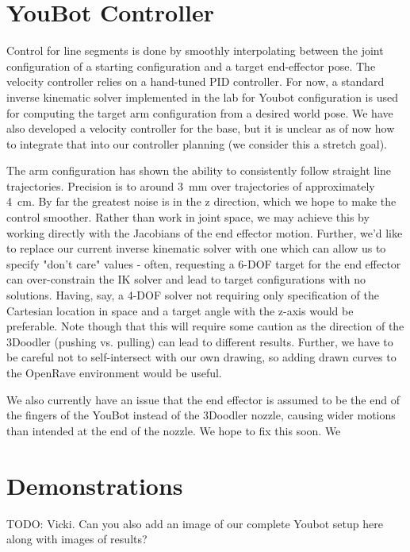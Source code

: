 \documentclass[conference]{acmsiggraph}
\begin{document}
\section{YouBot Controller}
Control for line segments is done by smoothly interpolating between the joint configuration of a starting configuration and a target end-effector pose.  The velocity controller relies on a hand-tuned PID controller.  For now, a standard inverse kinematic solver implemented in the lab for Youbot configuration is used for computing the target arm configuration from a desired world pose.  We have also developed a velocity controller for the base, but it is unclear as of now how to integrate that into our controller planning (we consider this a stretch goal).

The arm configuration has shown the ability to consistently follow straight line trajectories.  Precision is to around 3~mm over trajectories of approximately 4~cm.  By far the greatest noise is in the z direction, which we hope to make the control smoother.  Rather than work in joint space, we may achieve this by working directly with the Jacobians of the end effector motion.  Further, we'd like to replace our current inverse kinematic solver with one which can allow us to specify "don't care" values - often, requesting a 6-DOF target for the end effector can over-constrain the IK solver and lead to target configurations with no solutions.  Having, say, a 4-DOF solver not requiring only specification of the Cartesian location in space and a target angle with the z-axis would be preferable.  Note though that this will require some caution as the direction of the 3Doodler (pushing vs. pulling) can lead to different results.  Further, we have to be careful not to self-intersect with our own drawing, so adding drawn curves to the OpenRave environment would be useful.

We also currently have an issue that the end effector is assumed to be the end of the fingers of the YouBot instead of the 3Doodler nozzle, causing wider motions than intended at the end of the nozzle.  We hope to fix this soon.  We 

\section{Demonstrations}
TODO: Vicki.  Can you also add an image of our complete Youbot setup here along with images of results?






\end{document}
